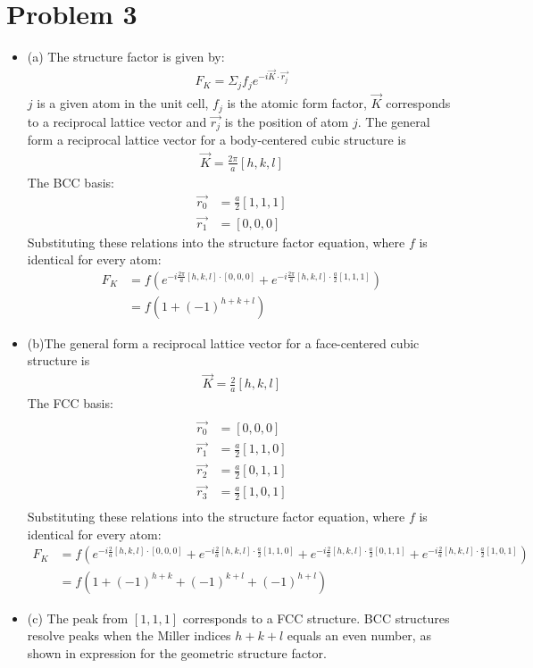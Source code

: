\documentclass{article}
\numberwithin{equation}{section}
\begin{document}
\section*{Problem 3}
\begin{itemize}
\item(a) The structure factor is given by:
\begin{align*}
F_K=\Sigma _j f_je^{-i \vec{K} \cdot\vec{r_j}}
\end{align*}
$j$ is a given atom in the unit cell, $f_j$ is the atomic form factor, $\vec{K}$ corresponds to a reciprocal lattice vector and $\vec{r_j}$ is the position of atom $j$.
The general form a reciprocal lattice vector for a body-centered cubic structure is
\begin{align*}
\vec{K}=\frac{2\pi}{a}[h,k,l]
\end{align*}
The BCC basis:
\begin{align*}
\vec{r_0}&=\frac{a}{2}[1,1,1]\\
\vec{r_1}&=[0,0,0]
\end{align*}
Substituting these relations into the structure factor equation, where $f$ is identical for every atom:
\begin{align*}
F_K&=f(e^{-i \frac{2\pi}{a}[h,k,l] \cdot [0,0,0]} + e^{-i \frac{2\pi}{a}[h,k,l] \cdot \frac{a}{2}[1,1,1]})
\\ &=f(1+(-1)^{h+k+l})
\end{align*}

\item(b)The general form a reciprocal lattice vector for a face-centered cubic structure is
\begin{align*}
\vec{K}=\frac{2}{a}[h,k,l]
\end{align*}
The FCC basis:
\begin{align*}\\
\vec{r_0}&=[0,0,0]\\
\vec{r_1}&=\frac{a}{2}[1,1,0]\\
\vec{r_2}&=\frac{a}{2}[0,1,1]\\
\vec{r_3}&=\frac{a}{2}[1,0,1]\\
\end{align*}
Substituting these relations into the structure factor equation, where $f$ is identical for every atom:
\begin{align*}
F_K &=f(e^{-i \frac{2}{a}[h,k,l] \cdot [0,0,0]} + e^{-i \frac{2}{a}[h,k,l] \cdot \frac{a}{2}[1,1,0]} + e^{-i \frac{2}{a}[h,k,l] \cdot \frac{a}{2}[0,1,1]}+ e^{-i\frac{2}{a}[h,k,l] \cdot \frac{a}{2}[1,0,1]})
\\ &=f(1+(-1)^{h+k}+(-1)^{k+l}+(-1)^{h+l})
\end{align*}
\item(c) The peak from $[1,1,1]$ corresponds to a FCC structure. BCC structures resolve peaks when the Miller indices $h+k+l$ equals an even number, as shown in expression for the geometric structure factor.


\end{itemize}
\end{document}
